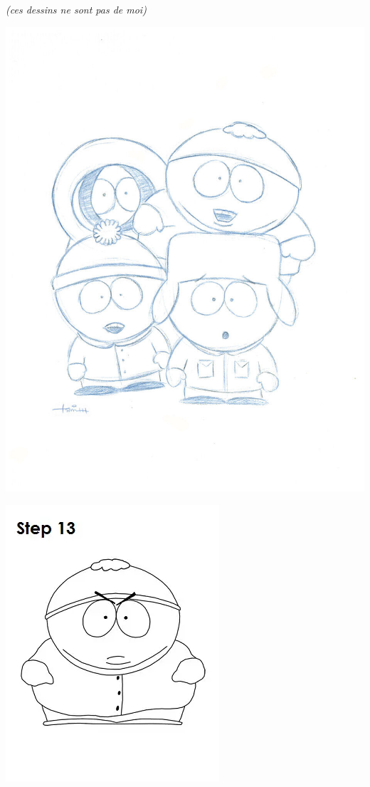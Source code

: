 \documentclass[11pt,a4paper]{article}
\begin{document}
\begin{center}
{\small \textit{(ces dessins ne sont pas de moi)}}

\begin{table}[ht!]
  \centering
  \begin{minipage}{0.50\textwidth}
    \centering

\includegraphics[trim={1.5cm 3cm 2cm 4cm},clip,scale=0.55]{img/sp_1.jpg}

  \end{minipage}
  \hfillx
  \begin{minipage}{0.50\textwidth}
    \centering

\includegraphics[trim={0.5cm 2cm 0.5cm 2cm},clip,scale=0.55]{img/sp_2.png}


\end{minipage}
\end{table}
\end{center}
\end{document}
